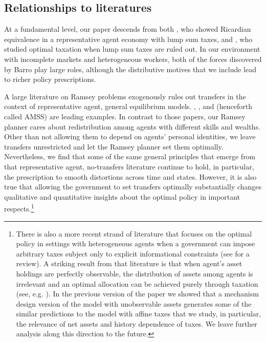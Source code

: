 \documentclass[thmsb,11pt]{article}
\begin{document}
\subsection{Relationships to literatures}

At a fundamental level, our paper descends from both \citet{Barro1974}, who showed Ricardian equivalence in a representative agent economy with lump sum taxes, and \citet{Barro1979}, who studied  optimal taxation  when lump sum taxes are ruled out. In our environment with incomplete markets and heterogeneous workers,  both of the forces discovered by Barro play large roles, although the distributive motives that we include lead to  richer policy prescriptions.

 A large  literature on Ramsey problems  exogenously rules out transfers in the context of representative agent, general equilibrium models.
  \citet{LucasJr.1983}, \citet{Chari1994},  and \citet{Aiyagari2002} (henceforth called  AMSS) are leading  examples.
In contrast to those papers, our Ramsey planner cares about redistribution among
agents with different skills and wealths. Other than not allowing them to depend
on agents' personal identities, we leave   transfers unrestricted and let  the Ramsey planner set
them optimally. Nevertheless, we find that  some of the same general principles that emerge from that
representative agent, no-transfers literature continue to hold, in particular, the prescription to
smooth distortions across time and states.  However, it is also true that
allowing the government to set transfers optimally substantially changes
qualitative and quantitative insights about the optimal policy in important
respects.\footnote{ There is also a more recent strand of literature that focuses on the optimal policy in settings with
heterogeneous agents when a government can impose arbitrary taxes subject only
to explicit informational constraints (see \citet{golosov2007new} for a review). A striking result from that literature
is that when  agent's asset holdings are perfectly observable, the distribution of assets among
agents is irrelevant and an optimal allocation can be achieved purely through
taxation (see, e.g. \citet{Bassetto2004}).  In the previous version of the paper we showed that a mechanism design version of the model with unobservable assets generates some of the similar predictions to the model with affine taxes that we study, in particular, the relevance of net assets and history dependence of taxes. We leave further analysis along this
direction to the  future.}
\end{document}
